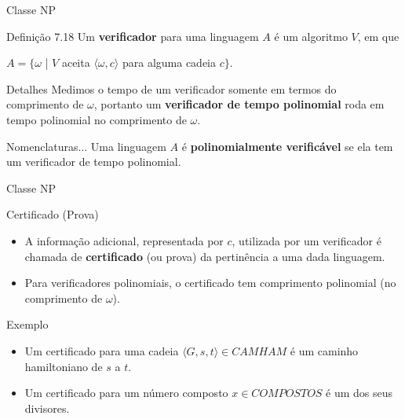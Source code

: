 \documentclass[xcolor=dvipsnames,table]{beamer}
\begin{document}
	\begin{frame}{Classe NP}
		\begin{block}{Definição 7.18}
			Um {\bf verificador} para uma linguagem $A$ é um algoritmo $V$, em que
			\begin{center}
				$A = \{ \omega$ | $V$ aceita $\langle \omega, c \rangle$ para alguma cadeia $c \}$.
			\end{center}
		\end{block} \pause
		\begin{block}{Detalhes}
			Medimos o tempo de um verificador somente em termos do comprimento de $\omega$, portanto um {\bf verificador de tempo polinomial} roda em tempo polinomial no comprimento de $\omega$. 
		\end{block} \pause
		\begin{block}{Nomenclaturas...}
			Uma linguagem $A$ é {\bf polinomialmente verificável} se ela tem um verificador de tempo polinomial.
		\end{block}
	\end{frame}		
	
	\begin{frame}{Classe NP}
		\begin{block}{Certificado (Prova)}
			\begin{itemize}
				\item A informação adicional, representada por $c$, utilizada por um verificador é chamada de {\bf certificado} (ou prova) da pertinência a uma dada linguagem. \pause
				\item Para verificadores polinomiais, o certificado tem comprimento polinomial (no comprimento de $\omega$).
			\end{itemize}
		\end{block} \pause
		\begin{block}{Exemplo}
			\begin{itemize}
				\item Um certificado para uma cadeia $\langle G, s, t \rangle \in CAMHAM$ é um caminho hamiltoniano de $s$ a $t$. \pause
				\item Um certificado para um número composto $x \in COMPOSTOS $ é um dos seus divisores.
			\end{itemize}
		\end{block}
	\end{frame}
	
\end{document}
